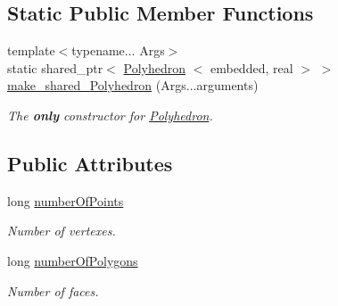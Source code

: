 \subsection*{\-Static \-Public \-Member \-Functions}
\begin{DoxyCompactItemize}
\item 
{\footnotesize template$<$typename... \-Args$>$ }\\static shared\-\_\-ptr$<$ \hyperlink{class_polyhedron}{\-Polyhedron}\*
$<$ embedded, real $>$ $>$ \hyperlink{class_polyhedron_afa6a4455081915cae5bf082f9f0a8cdf}{make\-\_\-shared\-\_\-\-Polyhedron} (\-Args...\-arguments)
\begin{DoxyCompactList}\small\item\em \-The {\bfseries only} constructor for \hyperlink{class_polyhedron}{\-Polyhedron}. \end{DoxyCompactList}\end{DoxyCompactItemize}
\subsection*{\-Public \-Attributes}
\begin{DoxyCompactItemize}
\item 
\hypertarget{class_polyhedron_ac6c8ccc4248cc0bbf64ef77cc412b844}{long \hyperlink{class_polyhedron_ac6c8ccc4248cc0bbf64ef77cc412b844}{number\-Of\-Points}}\label{class_polyhedron_ac6c8ccc4248cc0bbf64ef77cc412b844}

\begin{DoxyCompactList}\small\item\em \-Number of vertexes. \end{DoxyCompactList}\item 
\hypertarget{class_polyhedron_a6729506f577ffd64dce9cff14738a26d}{long \hyperlink{class_polyhedron_a6729506f577ffd64dce9cff14738a26d}{number\-Of\-Polygons}}\label{class_polyhedron_a6729506f577ffd64dce9cff14738a26d}

\begin{DoxyCompactList}\small\item\em \-Number of faces. \end{DoxyCompactList}\end{DoxyCompactItemize}
